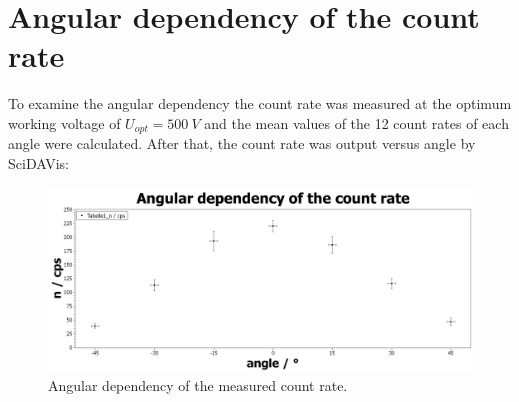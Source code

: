 \section{Angular dependency of the count rate}
To examine the angular dependency the count rate was measured at the optimum working voltage of
\(U_{opt}=\SI{500}{V}\) and the mean values of the 12 count rates of each angle were calculated. After that, the count rate was output
versus angle by SciDAVis:\par
\begin{figure}[H]
 \centering
 \includegraphics[width=.8\textwidth]{scidavis/Fig.7_Angular dependency of the count rate.jpg}
 \caption[Angular dependency of cps]{Angular dependency of the measured count rate.}
 \label{fig:angularDepCPS}
\end{figure}
%
